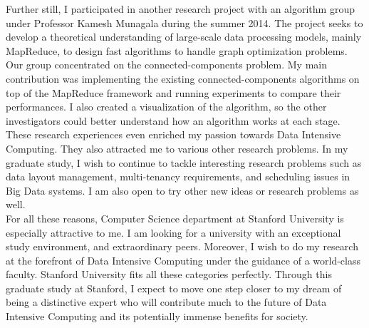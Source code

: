 \documentclass[11pt]{article}
\begin{document}
  Further still, I participated in another research project with an algorithm group under Professor Kamesh Munagala during the summer 2014. The project seeks to develop a theoretical understanding of large-scale data processing models, mainly MapReduce, to design fast algorithms to handle graph optimization problems. Our group concentrated on the connected-components problem. My main contribution was implementing the existing connected-components algorithms on top of the MapReduce framework and running experiments to compare their performances. I also created a visualization of the algorithm, so the other investigators could better understand how an algorithm works at each stage.\\

  These research experiences even enriched my passion towards Data Intensive Computing. They also attracted me to various other research problems. In my graduate study, I wish to continue to tackle interesting research problems such as data layout management, multi-tenancy requirements, and scheduling issues in Big Data systems. I am also open to try other new ideas or research problems as well.\\

  For all these reasons, Computer Science department at Stanford University is especially attractive to me. I am looking for a university with an exceptional study environment, and extraordinary peers. Moreover, I wish to do my research at the forefront of Data Intensive Computing under the guidance of a world-class faculty. Stanford University fits all these categories perfectly. Through this graduate study at Stanford, I expect to move one step closer to my dream of being a distinctive expert who will contribute much to the future of Data Intensive Computing and its potentially immense benefits for society.
\end{document}
